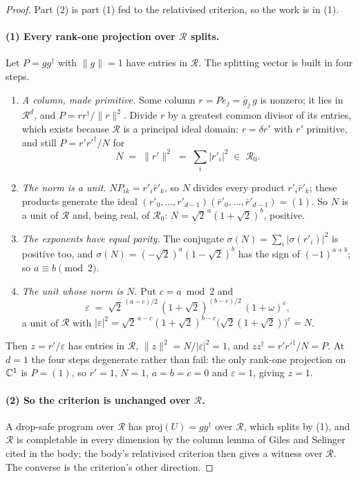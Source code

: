 \documentclass[acmsmall,screen,review,anonymous,nonacm]{acmart}
\begin{document}
\begin{proof}
Part (2) is part (1) fed to the relativised criterion, so the work is in (1).

\paragraph{(1) Every rank-one projection over $\mathcal R$ splits.} Let $P =
gg^{\dagger}$ with $\|g\| = 1$ have entries in $\mathcal R$. The splitting
vector is built in four steps.

\begin{enumerate}
\item \emph{A column, made primitive.} Some column $r = Pe_j = \bar g_j\,g$
  is nonzero; it lies in $\mathcal R^{d}$, and $P = rr^{\dagger}/\|r\|^{2}$.
  Divide $r$ by a greatest common divisor of its entries, which exists
  because $\mathcal R$ is a principal ideal domain: $r = \delta r'$ with $r'$
  primitive, and still $P = r'r'^{\dagger}/N$ for
  \[
    N \;=\; \|r'\|^{2} \;=\; \textstyle\sum_i |r'_i|^{2} \;\in\; \mathcal R_0 .
  \]

\item \emph{The norm is a unit.} $N P_{ik} = r'_i \bar r'_k$, so $N$ divides
  every product $r'_i \bar r'_k$; these products generate the ideal $(r'_0,
  \ldots, r'_{d-1})(\bar r'_0, \ldots, \bar r'_{d-1}) = (1)$. So $N$ is a
  unit of $\mathcal R$ and, being real, of $\mathcal R_0$: $N =
  \sqrt2^{\,a}(1+\sqrt2)^{b}$, positive.

\item \emph{The exponents have equal parity.} The conjugate $\sigma(N) =
  \sum_i |\sigma(r'_i)|^{2}$ is positive too, and $\sigma(N) =
  (-\sqrt2)^{a}(1-\sqrt2)^{b}$ has the sign of $(-1)^{a+b}$; so $a \equiv b
  \pmod 2$.

\item \emph{The unit whose norm is $N$.} Put $c = a \bmod 2$ and
  \[
    \varepsilon \;=\; \sqrt2^{\,(a-c)/2}\,(1+\sqrt2)^{(b-c)/2}\,(1+\omega)^{c},
  \]
  a unit of $\mathcal R$ with $|\varepsilon|^{2} = \sqrt2^{\,a-c}
  (1+\sqrt2)^{b-c}\bigl(\sqrt2(1+\sqrt2)\bigr)^{c} = N$.
\end{enumerate}

Then $z = r'/\varepsilon$ has entries in $\mathcal R$, $\|z\|^{2} =
N/|\varepsilon|^{2} = 1$, and $zz^{\dagger} = r'r'^{\dagger}/N = P$. At $d = 1$
the four steps degenerate rather than fail: the only rank-one projection on
$\mathbb{C}^{1}$ is $P = (1)$, so $r' = 1$, $N = 1$, $a = b = c = 0$ and $\varepsilon =
1$, giving $z = 1$.

\paragraph{(2) So the criterion is unchanged over $\mathcal R$.} A drop-safe
program over $\mathcal R$ has $\mathrm{proj}(U) = gg^{\dagger}$ over
$\mathcal R$, which splits by (1), and $\mathcal R$ is completable in every
dimension by the column lemma of Giles and Selinger cited in the body; the
body's relativised criterion then gives a witness over $\mathcal R$. The
converse is the criterion's other direction.
\end{proof}
\end{document}
